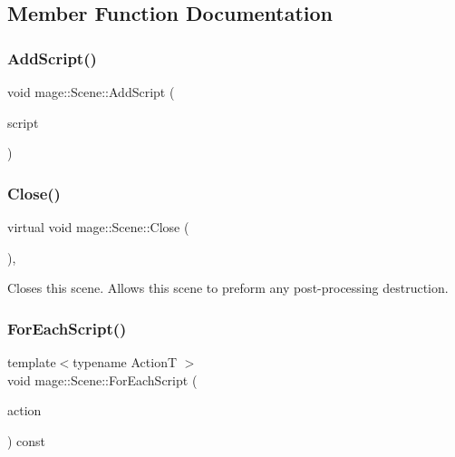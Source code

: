 \subsection{Member Function Documentation}
\hypertarget{classmage_1_1_scene_ab97b66c81c32681699052e154d0e0722}{}\label{classmage_1_1_scene_ab97b66c81c32681699052e154d0e0722} 
\subsubsection{\texorpdfstring{Add\+Script()}{AddScript()}}
{\footnotesize\ttfamily void mage\+::\+Scene\+::\+Add\+Script (\begin{DoxyParamCaption}\item[{\hyperlink{namespacemage_a1e01ae66713838a7a67d30e44c67703e}{Shared\+Ptr}$<$ \hyperlink{classmage_1_1_behavior_script}{Behavior\+Script} $>$}]{script }\end{DoxyParamCaption})}

\hypertarget{classmage_1_1_scene_a16786d7fcf0b813e2e94061b082cfd1d}{}\label{classmage_1_1_scene_a16786d7fcf0b813e2e94061b082cfd1d} 
\subsubsection{\texorpdfstring{Close()}{Close()}}
{\footnotesize\ttfamily virtual void mage\+::\+Scene\+::\+Close (\begin{DoxyParamCaption}{ }\end{DoxyParamCaption})\hspace{0.3cm}{\ttfamily [private]}, {\ttfamily [virtual]}}

Closes this scene. Allows this scene to preform any post-\/processing destruction. \hypertarget{classmage_1_1_scene_a4d16d973adce12868b9a0df9d92ef6d6}{}\label{classmage_1_1_scene_a4d16d973adce12868b9a0df9d92ef6d6} 
\subsubsection{\texorpdfstring{For\+Each\+Script()}{ForEachScript()}}
{\footnotesize\ttfamily template$<$typename ActionT $>$ \\
void mage\+::\+Scene\+::\+For\+Each\+Script (\begin{DoxyParamCaption}\item[{ActionT}]{action }\end{DoxyParamCaption}) const}


